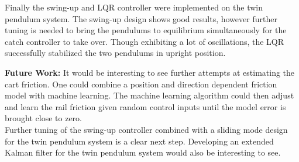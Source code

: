 Finally the swing-up and LQR controller were implemented on the twin pendulum system. The swing-up design shows good results, however further tuning is needed to bring the pendulums to equilibrium simultaneously for the catch controller to take over. Though exhibiting a lot of oscillations, the LQR successfully stabilized the two pendulums in upright position.

\textbf{Future Work:} It would be interesting to see further attempts at estimating the cart friction. One could combine a position and direction dependent friction model with machine learning. The machine learning algorithm could then adjust and learn the rail friction given random control inputs until the model error is brought close to zero.\\
Further tuning of the swing-up controller combined with a sliding mode design for the twin pendulum system is a clear next step. Developing an extended Kalman filter for the twin pendulum system would also be interesting to see.